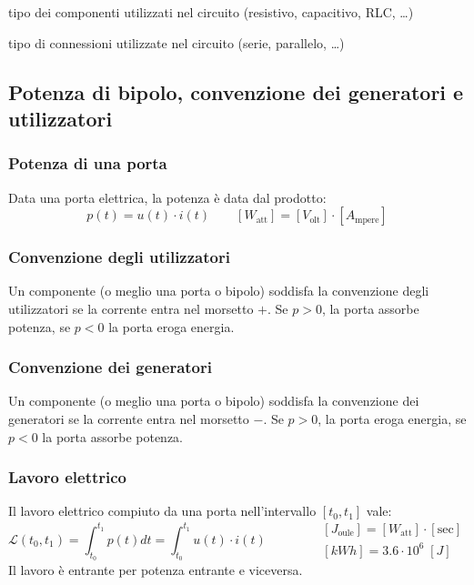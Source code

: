 \documentclass[a4paper]{article}
\begin{document}
\begin{description}[itemsep=0pt]
	\item[Tipologia] tipo dei componenti utilizzati nel circuito (resistivo, capacitivo, RLC, \dots)
	\item[Topologia] tipo di connessioni utilizzate nel circuito (serie, parallelo, \dots)
\end{description}

\subsection{Potenza di bipolo, convenzione dei generatori e utilizzatori}
\subsubsection*{Potenza di una porta}
Data una porta elettrica, la potenza è data dal prodotto:
\[p(t) = u(t) \cdot i(t) \qquad [W_\text{att}] = [V_\text{olt}] \cdot [A_\text{mpere}]\]

\subsubsection*{Convenzione degli utilizzatori}
Un componente (o meglio una porta o bipolo) soddisfa la convenzione degli utilizzatori se la corrente entra nel morsetto \(+\).
Se \(p > 0\), la porta assorbe potenza, se \(p < 0\) la porta eroga energia.

\subsubsection*{Convenzione dei generatori}
Un componente (o meglio una porta o bipolo) soddisfa la convenzione dei generatori se la corrente entra nel morsetto \(-\).
Se \(p > 0\), la porta eroga energia, se \(p < 0\) la porta assorbe potenza.

\subsubsection*{Lavoro elettrico}
Il lavoro elettrico compiuto da una porta nell'intervallo \([t_0, t_1]\) vale:
\[\mathcal{L}(t_0,t_1) = \int_{t_0}^{t_1} p(t) dt = \int_{t_0}^{t_1} u(t) \cdot i(t) \qquad\qquad
\begin{matrix} [J_\text{oule}] = [W_\text{att}] \cdot [\text{sec}] \\[5pt] [kWh] = 3.6 \cdot 10^6 \; [J] \end{matrix}\]
Il lavoro è entrante per potenza entrante e viceversa.
\end{document}
